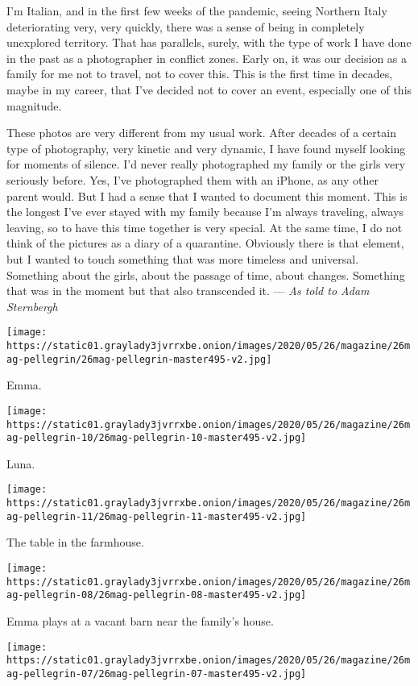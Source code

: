 I'm Italian, and in the first few weeks of the pandemic, seeing Northern
Italy deteriorating very, very quickly, there was a sense of being in
completely unexplored territory. That has parallels, surely, with the
type of work I have done in the past as a photographer in conflict
zones. Early on, it was our decision as a family for me not to travel,
not to cover this. This is the first time in decades, maybe in my
career, that I've decided not to cover an event, especially one of this
magnitude.

These photos are very different from my usual work. After decades of a
certain type of photography, very kinetic and very dynamic, I have found
myself looking for moments of silence. I'd never really photographed my
family or the girls very seriously before. Yes, I've photographed them
with an iPhone, as any other parent would. But I had a sense that I
wanted to document this moment. This is the longest I've ever stayed
with my family because I'm always traveling, always leaving, so to have
this time together is very special. At the same time, I do not think of
the pictures as a diary of a quarantine. Obviously there is that
element, but I wanted to touch something that was more timeless and
universal. Something about the girls, about the passage of time, about
changes. Something that was in the moment but that also transcended it.
--- \emph{As told to Adam Sternbergh}

\texttt{[image: https://static01.graylady3jvrrxbe.onion/images/2020/05/26/magazine/26mag-pellegrin/26mag-pellegrin-master495-v2.jpg]}

Emma.

\texttt{[image: https://static01.graylady3jvrrxbe.onion/images/2020/05/26/magazine/26mag-pellegrin-10/26mag-pellegrin-10-master495-v2.jpg]}

Luna.

\texttt{[image: https://static01.graylady3jvrrxbe.onion/images/2020/05/26/magazine/26mag-pellegrin-11/26mag-pellegrin-11-master495-v2.jpg]}

The table in the farmhouse.

\texttt{[image: https://static01.graylady3jvrrxbe.onion/images/2020/05/26/magazine/26mag-pellegrin-08/26mag-pellegrin-08-master495-v2.jpg]}

Emma plays at a vacant barn near the family's house.

\texttt{[image: https://static01.graylady3jvrrxbe.onion/images/2020/05/26/magazine/26mag-pellegrin-07/26mag-pellegrin-07-master495-v2.jpg]}

